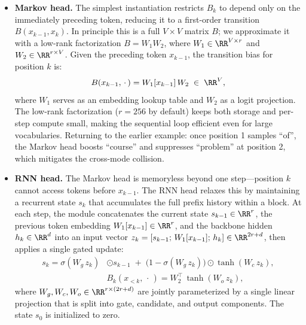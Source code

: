\begin{itemize}
    \setlength{\itemsep}{10pt}
    \item \textbf{Markov head.} The simplest instantiation restricts $B_k$ to depend only on the immediately preceding token, reducing it to a first-order transition $B(x_{k-1}, x_k)$.
    In principle this is a full $V \times V$ matrix $B$; we approximate it with a low-rank factorization $B = W_1 W_2$, where $W_1 \in \RR^{V \times r}$ and $W_2 \in \RR^{r \times V}$.
    Given the preceding token $x_{k-1}$, the transition bias for position $k$ is:
    \begin{equation}
    B(x_{k-1},\, \cdot\,) = W_1[x_{k-1}] \, W_2 \;\in\; \RR^{V},
    \label{eq:markov}
    \end{equation}
    where $W_1$ serves as an embedding lookup table and $W_2$ as a logit projection.
    The low-rank factorization ($r{=}256$ by default) keeps both storage and per-step compute small, making the sequential loop efficient even for large vocabularies.
    Returning to the earlier example: once position 1 samples ``of'', the Markov head boosts ``course'' and suppresses ``problem'' at position 2, which mitigates the cross-mode collision.

    \item \textbf{RNN head.} The Markov head is memoryless beyond one step—position $k$ cannot access tokens before $x_{k-1}$.
    The RNN head relaxes this by maintaining a recurrent state $s_k$ that accumulates the full prefix history within a block.
    At each step, the module concatenates the current state $s_{k-1} \in \RR^{r}$, the previous token embedding $W_1[x_{k-1}] \in \RR^{r}$, and the backbone hidden $h_k \in \RR^{d}$ into an input vector $z_k = [s_{k-1};\, W_1[x_{k-1}];\, h_k] \in \RR^{2r+d}$, then applies a single gated update:
    \begin{equation}
    \begin{aligned}
    s_k = \sigma(W_g\, z_k)& \odot s_{k-1} \;+\; \bigl(1 - \sigma(W_g\, z_k)\bigr) \odot \tanh(W_c\, z_k), \label{eq:rnn}\\
    &B_k(x_{<k},\, \cdot\,) = W_2^\top\, \tanh(W_o\, z_k),
    \end{aligned}
    \end{equation}
    where $W_g, W_c, W_o \in \RR^{r\times(2r+d)}$ are jointly parameterized by a single linear projection that is split into gate, candidate, and output components.
    The state $s_0$ is initialized to zero.
\end{itemize}

